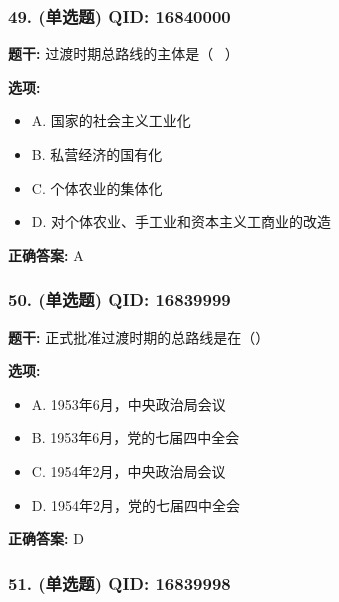 \documentclass[12pt,UTF8]{ctexart}
\begin{document}
\subsubsection*{49. (单选题) \small QID: 16840000}

\textbf{题干:}
过渡时期总路线的主体是（  ）

\textbf{选项:}
\begin{itemize}[leftmargin=*]

  \item A. 国家的社会主义工业化

  \item B. 私营经济的国有化

  \item C. 个体农业的集体化

  \item D. 对个体农业、手工业和资本主义工商业的改造

\end{itemize}

\textbf{正确答案:}
A

\vspace{0.3em}\hrulefill\vspace{0.7em}

\subsubsection*{50. (单选题) \small QID: 16839999}

\textbf{题干:}
正式批准过渡时期的总路线是在（）

\textbf{选项:}
\begin{itemize}[leftmargin=*]

  \item A. 1953年6月，中央政治局会议

  \item B. 1953年6月，党的七届四中全会

  \item C. 1954年2月，中央政治局会议

  \item D. 1954年2月，党的七届四中全会

\end{itemize}

\textbf{正确答案:}
D

\vspace{0.3em}\hrulefill\vspace{0.7em}

\subsubsection*{51. (单选题) \small QID: 16839998}
\end{document}
